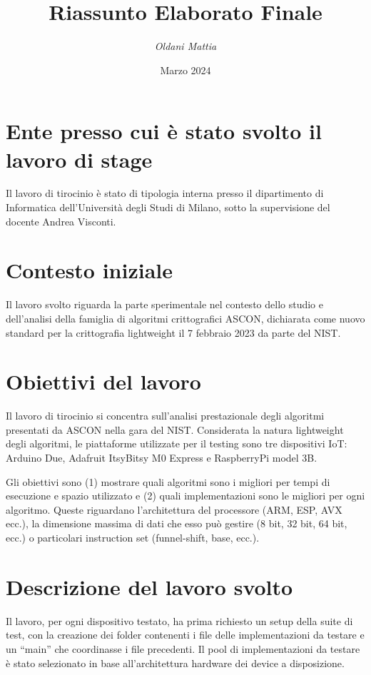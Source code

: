 \documentclass[a4paper, 12pt, italian]{extarticle}
\title{\huge \bfseries Riassunto Elaborato Finale}
\author{\Large \textit{Oldani Mattia}}
\date{Marzo 2024}
\begin{document}
\maketitle

\section{Ente presso cui è stato svolto il lavoro di stage}

Il lavoro di tirocinio è stato di tipologia interna presso il dipartimento di Informatica dell'Università degli Studi di Milano, sotto la supervisione del docente Andrea Visconti.

\section{Contesto iniziale}

Il lavoro svolto riguarda la parte sperimentale nel contesto dello studio e dell'analisi della famiglia di algoritmi crittografici ASCON, dichiarata come nuovo standard per la crittografia lightweight il 7 febbraio 2023 da parte del NIST.

\section{Obiettivi del lavoro}

Il lavoro di tirocinio si concentra sull'analisi prestazionale degli algoritmi presentati da ASCON nella gara del NIST. Considerata la natura lightweight degli algoritmi, le piattaforme utilizzate per il testing sono tre dispositivi IoT: Arduino Due, Adafruit ItsyBitsy M0 Express e RaspberryPi model 3B. 

Gli obiettivi sono (1) mostrare quali algoritmi sono i migliori per tempi di esecuzione e spazio utilizzato e (2) quali implementazioni sono le migliori per ogni algoritmo. Queste riguardano l'architettura del processore (ARM, ESP, AVX ecc.), la dimensione massima di dati che esso può gestire (8 bit, 32 bit, 64 bit, ecc.) o particolari instruction set (funnel-shift, base, ecc.).

\section{Descrizione del lavoro svolto}

Il lavoro, per ogni dispositivo testato, ha prima richiesto un setup della suite di test, con la creazione dei folder contenenti i file delle implementazioni da testare e un ``main'' che coordinasse i file precedenti. Il pool di implementazioni da testare è stato selezionato in base all'architettura hardware dei device a disposizione.
\end{document}
